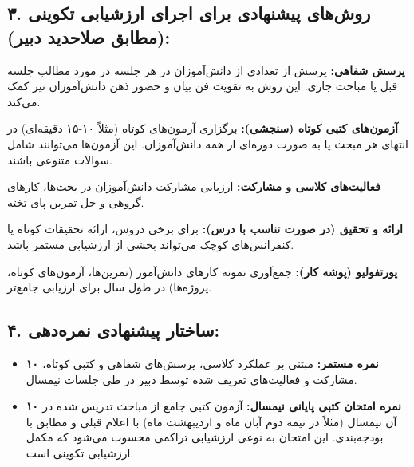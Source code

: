 \documentclass[a4paper,14pt]{article}
\begin{document}
\subsection*{۳. روش‌های پیشنهادی برای اجرای ارزشیابی تکوینی (مطابق صلاحدید دبیر):}
\textbf{پرسش شفاهی:} پرسش از تعدادی از دانش‌آموزان در هر جلسه در مورد مطالب جلسه قبل یا مباحث جاری. این روش به تقویت فن بیان و حضور ذهن دانش‌آموزان نیز کمک می‌کند.

\textbf{آزمون‌های کتبی کوتاه (سنجشی):} برگزاری آزمون‌های کوتاه (مثلاً ۱۰-۱۵ دقیقه‌ای) در انتهای هر مبحث یا به صورت دوره‌ای از همه دانش‌آموزان. این آزمون‌ها می‌توانند شامل سوالات متنوعی باشند.

\textbf{فعالیت‌های کلاسی و مشارکت:} ارزیابی مشارکت دانش‌آموزان در بحث‌ها، کارهای گروهی و حل تمرین پای تخته.

\textbf{ارائه و تحقیق (در صورت تناسب با درس):} برای برخی دروس، ارائه تحقیقات کوتاه یا کنفرانس‌های کوچک می‌تواند بخشی از ارزشیابی مستمر باشد.

\textbf{پورتفولیو (پوشه کار):} جمع‌آوری نمونه کارهای دانش‌آموز (تمرین‌ها، آزمون‌های کوتاه، پروژه‌ها) در طول سال برای ارزیابی جامع‌تر.
\medskip

\subsection*{۴. ساختار پیشنهادی نمره‌دهی:}
\begin{itemize}
    \item \textbf{۱۰ نمره مستمر:} مبتنی بر عملکرد کلاسی، پرسش‌های شفاهی و کتبی کوتاه، مشارکت و فعالیت‌های تعریف شده توسط دبیر در طی جلسات نیمسال.
    \item \textbf{۱۰ نمره امتحان کتبی پایانی نیمسال:} آزمون کتبی جامع از مباحث تدریس شده در آن نیمسال (مثلاً در نیمه دوم آبان ماه و اردیبهشت ماه) با اعلام قبلی و مطابق با بودجه‌بندی. این امتحان به نوعی ارزشیابی تراکمی محسوب می‌شود که مکمل ارزشیابی تکوینی است.
\end{itemize}
\medskip
\end{document}
